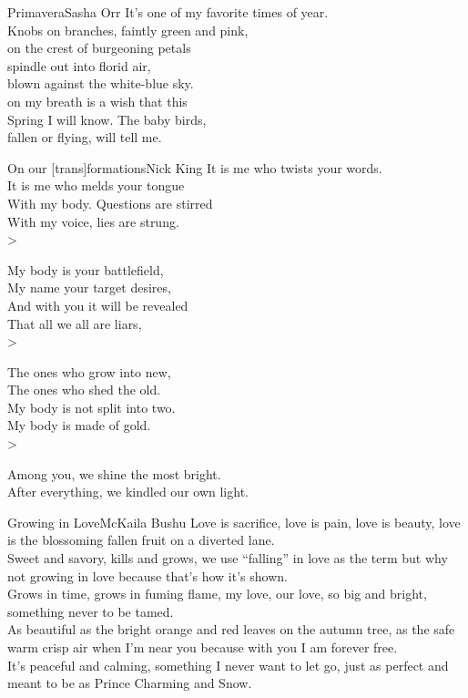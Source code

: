\begin{poetry}{Primavera}{Sasha Orr}
It's one of my favorite times of year.\\
Knobs on branches, faintly green and pink,\\
on the crest of burgeoning petals\\
spindle out into florid air,\\
blown against the white-blue sky.\\
on my breath is a wish that this\\
Spring I will know. The baby birds,\\
fallen or flying, will tell me.
\end{poetry}

\begin{poetry}{On our [trans]formations}{Nick King}
It is me who twists your words.\\
It is me who melds your tongue\\
With my body. Questions are stirred\\
With my voice, lies are strung.\\>

My body is your battlefield,\\
My name your target desires,\\
And with you it will be revealed\\
That all we all are liars,\\>

The ones who grow into new,\\
The ones who shed the old.\\
My body is not split into two.\\
My body is made of gold.\\>

Among you, we shine the most bright.\\
After everything, we kindled our own light.
\end{poetry}

\begin{poetry}{Growing in Love}{McKaila Bushu}
Love is sacrifice, love is pain, love is beauty, love is the blossoming fallen fruit on a diverted lane.\\
Sweet and savory, kills and grows, we use “falling” in love as the term but why not growing in love because that's how it's shown.\\
Grows in time, grows in fuming flame, my love, our love, so big and bright, something never to be tamed.\\
As beautiful as the bright orange and red leaves on the autumn tree, as the safe warm crisp air when I'm near you because with you I am forever free.\\
It's peaceful and calming, something I never want to let go, just as perfect and meant to be as Prince Charming and Snow.
\end{poetry}

